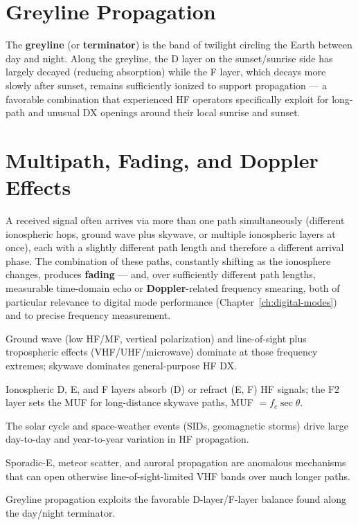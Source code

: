 \section{Greyline Propagation}

The \textbf{greyline} (or \textbf{terminator}) is the band of twilight
circling the Earth between day and night. Along the greyline, the D
layer on the sunset/sunrise side has largely decayed (reducing
absorption) while the F layer, which decays more slowly after sunset,
remains sufficiently ionized to support propagation --- a favorable
combination that experienced HF operators specifically exploit for
long-path and unusual DX openings around their local sunrise and
sunset.

\section{Multipath, Fading, and Doppler Effects}

A received signal often arrives via more than one path simultaneously
(different ionospheric hops, ground wave plus skywave, or multiple
ionospheric layers at once), each with a slightly different path length
and therefore a different arrival phase. The combination of these
paths, constantly shifting as the ionosphere changes, produces
\textbf{fading} --- and, over sufficiently different path lengths,
measurable time-domain echo or \textbf{Doppler}-related frequency
smearing, both of particular relevance to digital mode performance
(Chapter~\ref{ch:digital-modes}) and to precise frequency measurement.

\begin{quickreview}
\item Ground wave (low HF/MF, vertical polarization) and line-of-sight
plus tropospheric effects (VHF/UHF/microwave) dominate at those
frequency extremes; skywave dominates general-purpose HF DX.
\item Ionospheric D, E, and F layers absorb (D) or refract (E, F)
HF signals; the F2 layer sets the MUF for long-distance skywave paths,
MUF $= f_c\sec\theta$.
\item The solar cycle and space-weather events (SIDs, geomagnetic
storms) drive large day-to-day and year-to-year variation in HF
propagation.
\item Sporadic-E, meteor scatter, and auroral propagation are
anomalous mechanisms that can open otherwise line-of-sight-limited
VHF bands over much longer paths.
\item Greyline propagation exploits the favorable D-layer/F-layer
balance found along the day/night terminator.
\end{quickreview}

